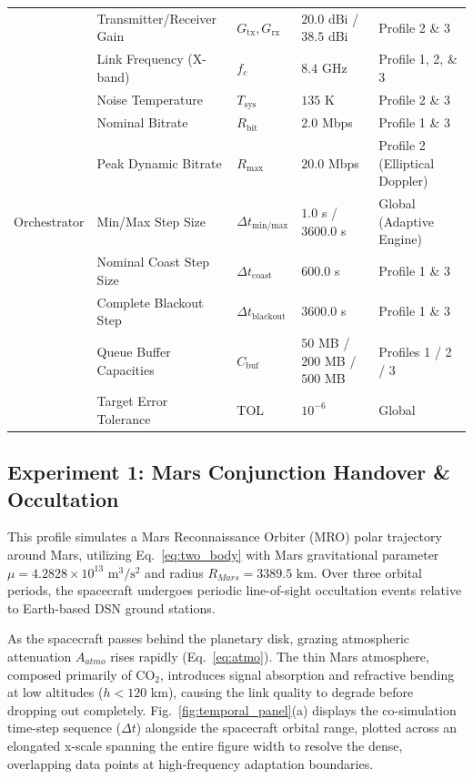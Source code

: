 \documentclass[a4paper,fleqn]{cas-sc}
\begin{document}
\begin{table}[htbp]
\begin{tabular}{p{2.0cm}p{3.3cm}p{1.2cm}p{2.6cm}p{3.7cm}}
 & Transmitter/Receiver Gain & $G_{\text{tx}}, G_{\text{rx}}$ & $20.0$ dBi / $38.5$ dBi & Profile 2 \& 3 \\
 & Link Frequency (X-band) & $f_c$ & $8.4$ GHz & Profile 1, 2, \& 3 \\
 & Noise Temperature & $T_{\text{sys}}$ & $135$ K & Profile 2 \& 3 \\
 & Nominal Bitrate & $R_{\text{bit}}$ & $2.0$ Mbps & Profile 1 \& 3 \\
 & Peak Dynamic Bitrate & $R_{\text{max}}$ & $20.0$ Mbps & Profile 2 (Elliptical Doppler) \\
\midrule
Orchestrator & Min/Max Step Size & $\Delta t_{\text{min/max}}$ & $1.0$ s / $3600.0$ s & Global (Adaptive Engine) \\
 & Nominal Coast Step Size & $\Delta t_{\text{coast}}$ & $600.0$ s & Profile 1 \& 3 \\
 & Complete Blackout Step & $\Delta t_{\text{blackout}}$ & $3600.0$ s & Profile 1 \& 3 \\
 & Queue Buffer Capacities & $C_{\text{buf}}$ & $50$ MB / $200$ MB / $500$ MB & Profiles 1 / 2 / 3 \\
 & Target Error Tolerance & $\text{TOL}$ & $10^{-6}$ & Global \\
\bottomrule
\end{tabular}
\end{table}

\subsection{Experiment 1: Mars Conjunction Handover \& Occultation}
This profile simulates a Mars Reconnaissance Orbiter (MRO) polar trajectory around Mars, utilizing Eq.~\eqref{eq:two_body} with Mars gravitational parameter $\mu = 4.2828 \times 10^{13} \text{ m}^3/\text{s}^2$ and radius $R_{Mars} = 3389.5$ km. Over three orbital periods, the spacecraft undergoes periodic line-of-sight occultation events relative to Earth-based DSN ground stations.

As the spacecraft passes behind the planetary disk, grazing atmospheric attenuation $A_{atmo}$ rises rapidly (Eq.~\eqref{eq:atmo}). The thin Mars atmosphere, composed primarily of $\text{CO}_2$, introduces signal absorption and refractive bending at low altitudes ($h < 120$ km), causing the link quality to degrade before dropping out completely. Fig.~\ref{fig:temporal_panel}(a) displays the co-simulation time-step sequence ($\Delta t$) alongside the spacecraft orbital range, plotted across an elongated x-scale spanning the entire figure width to resolve the dense, overlapping data points at high-frequency adaptation boundaries.
\end{document}
